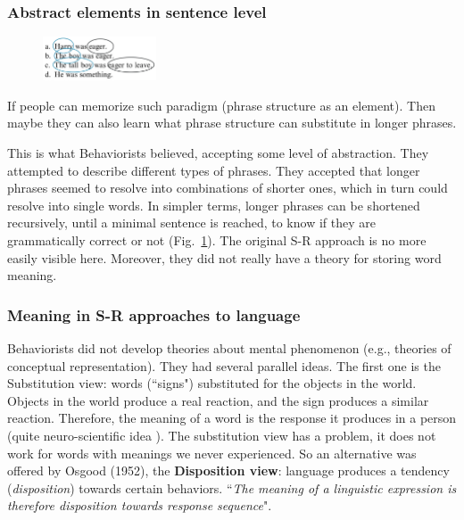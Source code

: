 \subsubsection{Abstract elements in sentence level}

\begin{figure}
  \centering
  \includegraphics[width=0.3\textwidth]{images/elements.png}
  \caption{}
  \label{fig:elements}
\end{figure}
If people can memorize such paradigm (phrase structure as an element). Then maybe they can also learn what phrase structure can substitute in longer phrases.

This is what Behaviorists believed, accepting some level of abstraction. They attempted to describe different types of phrases. They accepted that longer phrases seemed to resolve into combinations of shorter ones, which in turn could resolve into single words. In simpler terms, longer phrases can be shortened recursively, until a minimal sentence is reached, to know if they are grammatically correct or not (Fig.~\ref{fig:elements}).
The original S-R approach is no more easily visible here.
Moreover, they did not really have a theory for storing word meaning.

\subsubsection{Meaning in S-R approaches to language}
Behaviorists did not develop theories about mental phenomenon (e.g., theories of conceptual representation). They had several parallel ideas.
The first one is the {Substitution view}: words (``signs") substituted for the objects in the world. Objects in the world produce a real reaction, and the sign produces a similar reaction.  Therefore, the meaning of a word is the response it produces in a person (quite neuro-scientific idea \notet). The substitution view has a problem, it does not work for words with meanings we never experienced. So an alternative was offered by Osgood (1952), the \textbf{Disposition view}: language produces a tendency (\textit{disposition}) towards certain behaviors. ``\textit{The meaning of a linguistic expression is therefore disposition towards response sequence}".


